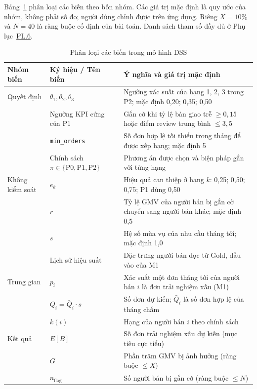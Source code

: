 \documentclass[a4paper]{article}
\begin{document}
Bảng~\ref{tab:dss_variables} phân loại các biến theo bốn nhóm. Các giá trị mặc định là quy ước của nhóm, không phải số đo; người dùng chỉnh được trên ứng dụng. Riêng $X = 10\%$ và $N = 40$ là ràng buộc cố định của bài toán. Danh sách tham số đầy đủ ở Phụ lục~\hyperref[pl:6]{PL.6}.

\begin{table}[htbp]
\centering
\footnotesize
\setlength{\tabcolsep}{3pt}
\renewcommand{\arraystretch}{1.1}
\caption{Phân loại các biến trong mô hình DSS}
\label{tab:dss_variables}
\begin{tabularx}{\textwidth}{@{}>{\raggedright\arraybackslash}p{2.3cm}>{\raggedright\arraybackslash}p{5.0cm}>{\raggedright\arraybackslash}X@{}}
\toprule
\textbf{Nhóm biến} & \textbf{Ký hiệu / Tên biến} & \textbf{Ý nghĩa và giá trị mặc định} \\
\midrule
Quyết định & $\theta_1, \theta_2, \theta_3$ & Ngưỡng xác suất của hạng 1, 2, 3 trong P2; mặc định 0,20; 0,35; 0,50 \\
 & Ngưỡng KPI cứng của P1 & Gắn cờ khi tỷ lệ bàn giao trễ $\ge 0{,}15$ hoặc điểm review trung bình $\le 3{,}5$ \\
 & \texttt{min\_orders} & Số đơn hợp lệ tối thiểu trong tháng để được xếp hạng; mặc định 5 \\
 & Chính sách $\pi \in \{\text{P0}, \text{P1}, \text{P2}\}$ & Phương án được chọn và biện pháp gắn với từng hạng \\
\addlinespace
Không kiểm soát & $e_k$ & Hiệu quả can thiệp ở hạng $k$: 0,25; 0,50; 0,75; P1 dùng 0,50 \\
 & $r$ & Tỷ lệ GMV của người bán bị gắn cờ chuyển sang người bán khác; mặc định 0,5 \\
 & $s$ & Hệ số mùa vụ của nhu cầu tháng tới; mặc định 1,0 \\
 & Lịch sử hiệu suất & Đặc trưng người bán đọc từ Gold, đầu vào của M1 \\
\addlinespace
Trung gian & $p_i$ & Xác suất một đơn tháng tới của người bán $i$ là đơn trải nghiệm xấu (M1) \\
 & $Q_i = \bar{Q}_i \cdot s$ & Số đơn dự kiến; $\bar{Q}_i$ là số đơn hợp lệ của tháng chấm \\
 & $k(i)$ & Hạng của người bán $i$ theo chính sách \\
\addlinespace
Kết quả & $E[B]$ & Số đơn trải nghiệm xấu dự kiến (mục tiêu cực tiểu) \\
 & $G$ & Phần trăm GMV bị ảnh hưởng (ràng buộc $\le X$) \\
 & $n_{\text{flag}}$ & Số người bán bị gắn cờ (ràng buộc $\le N$) \\
\bottomrule
\end{tabularx}
\end{table}
\end{document}
